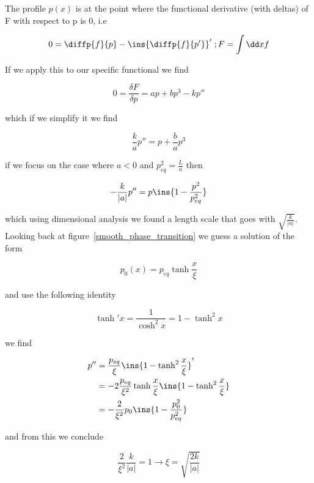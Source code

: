 The profile \(p(x)\) is at the point where the functional derivative  (with deltas) of F with respect to p is 0, i.e

\begin{equation}
	0=\diffp{f}{p}-\ins{\diffp{f}{p'}}' \; ; F=\int\dd xf
\end{equation}

If we apply this to our specific functional we find

\begin{equation}
	0 = \frac{\delta F}{\delta p} = ap+bp^3-kp''
\end{equation}

which if we simplify it we find

\begin{equation}
	\frac{k}{a}p''=p+\frac{b}{a}p^3
\end{equation}

if we focus on the case where \(a<0\) and \(p_{eq}^2=\frac{L}{a}\) then

\begin{equation}
	-\frac{k}{\lvert a \rvert}p'' = p\ins{1-\frac{p^2}{p_{eq}^2}}
\end{equation}

which using dimensional analysis we found a length scale that goes with \(\sqrt{\frac{k}{\lvert a \rvert}}\). Looking back at figure~\ref{smooth_phase_transition} we guess a solution of the form

\begin{equation}
	p_0(x) = p_{eq}\tanh\frac{x}{\xi}
\end{equation}

and use the following identity

\begin{equation}
	\tanh'x=\frac{1}{\cosh^2x}=1-\tanh^2x
\end{equation}

we find

\begin{align}
	p'' &= \frac{p_{eq}}{\xi}\ins{1-\tanh^2\frac{x}{\xi}}'\\
	&= -2\frac{p_{eq}}{\xi^2}\tanh\frac{x}{\xi}\ins{1-\tanh^2\frac{x}{\xi}}\\
	&= -\frac{2}{\xi^2}p_0\ins{1-\frac{p_0^2}{p_{eq}^2}}
\end{align}

and from this we conclude

\begin{equation}
	\frac{2}{\xi^2}\frac{k}{\lvert a \rvert}=1 \rightarrow \xi = \sqrt{\frac{2k}{\lvert a \rvert}}
\end{equation}

